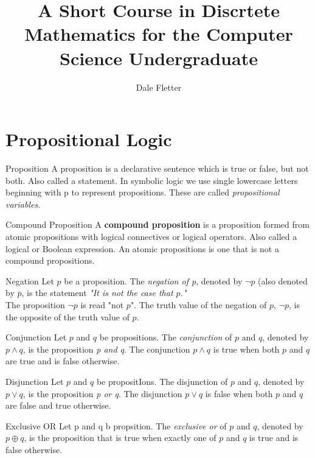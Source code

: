 \documentclass [handout]{beamer}
\title[Discrete Math]{A Short Course in Discrtete Mathematics for the Computer Science Undergraduate}
\author{Dale Fletter}
\institute{UC Davis, ECS20, Summer Session 2}
\date{}
\begin{document}
\begin{frame}
\titlepage
\end{frame}

\section{Propositional Logic}
\begin{frame}{Proposition}
A proposition is a declarative sentence which is true or false, but not both. Also called a statement. In symbolic logic we use single lowercase letters beginning with p to represent propositions. These are called \textit{propositional variables}.
\end{frame}

\begin{frame}{Compound Proposition}
A \textbf{compound proposition} is a proposition formed from atomic propositions with logical connectives or logical operators. Also called a logical or Boolean expression. An atomic propositions is one that is not a compound propositions.
\end{frame}

\begin{frame}{Negation}
Let $p$ be a proposition. The \textit{negation of p}, denoted by $\lnot p$ (also denoted by $\overline{p}$, is the statement 
\textit{"It is not the case that $p$."}\\
The proposition $\lnot p$ is read "not $p$". The truth value of the negation of $p$,  $\lnot p$, is the opposite of the truth value of $p$.
\end{frame}

\begin{frame}{Conjunction}
Let $p$ and $q$ be propositions. The \textit{conjunction} of $p$ and $q$, denoted by $ p \land q$, is the proposition \textit{p and q}. The conjunction $p \land q$ is true when both $p$ and $q$ are true and is false otherwise.
\end{frame}

\begin{frame}{Disjunction}
Let $p$ and $q$ be propositIons. The disjunction of $p$ and $q$, denoted by $p \lor q$, is the proposition \textit{p or q}. The disjunction $p \lor q$ is false when both $p$ and $q$ are false and true otherwise.
\end{frame}

\begin{frame}{Exclusive OR}
Let p and q b propsition. The \textit{exclusive or} of $p$ and $q$, denoted by $p \oplus q$, is the proposition that is true when exactly one of $p$ and $q$ is true and is false otherwise.
\end{frame}
\end{document}

